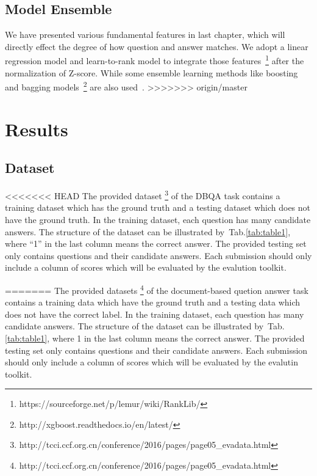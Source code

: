 \documentclass{llncs}
\begin{document}
\begin{table}[!htbp]
\begin{table}[!htbp]
\subsection{Model Ensemble}
\label{sec:model}
We have presented various fundamental features in last chapter, which will directly effect the degree of how question and answer matches. We adopt a linear regression model and learn-to-rank model \cite{Liu2009Learning} to integrate those features~\footnote{https://sourceforge.net/p/lemur/wiki/RankLib/} after the normalization of Z-score. While some ensemble learning methods like boosting and bagging models~\footnote{http://xgboost.readthedocs.io/en/latest/} are also used~\cite{Chen2016XGBoost}. 
>>>>>>> origin/master


\section{Results}
\label{sec:results}

\subsection{Dataset}

<<<<<<< HEAD
The provided dataset \footnote{ http://tcci.ccf.org.cn/conference/2016/pages/page05\_evadata.html} of the DBQA task contains a training dataset which has the ground truth and a testing dataset which does not have the ground truth. In the training dataset, each question has many candidate answers. The structure of the dataset can be illustrated by~Tab.\ref{tab:table1}, where ``1'' in the last column means the correct answer. The provided testing set only contains questions and their candidate answers. Each submission should only include a column of scores which will be evaluated by the evalution toolkit.  


\begin{table}[!htbp]
=======
The provided datasets \footnote{ http://tcci.ccf.org.cn/conference/2016/pages/page05\_evadata.html} of the document-based quetion answer task contains a training data which have the ground truth and a testing data which does not have the correct label. In the training dataset, each question has many candidate answers. The structure of the dataset can be illustrated by~Tab.\ref{tab:table1}, where 1 in the last column means the correct answer. The provided testing set only contains questions and their candidate answers. Each submission should only include a column of scores which will be evaluated by the evalutin toolkit.  



\end{table}
\end{table}
\end{table}
\end{document}
